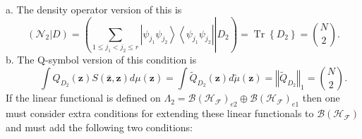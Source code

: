 \documentclass[aps,preprint]{revtex4}%
\begin{document}
\begin{enumerate}
a. The density operator version of this is
\begin{equation}
\left(  \left.  \mathcal{N}_{2}\right\vert D\right)  =\left(  \left.
\sum_{1\leq j_{1}<j_{2}\leq r}\left\vert \psi_{j_{1}}\psi_{j_{2}}\right\rangle
\left\langle \psi_{j_{1}}\psi_{j_{2}}\right\vert \right\vert D_{2}\right)
=\operatorname*{Tr}\left\{  D_{2}\right\}  =\binom{N}{2}.
\end{equation}
b. The Q-symbol version of this condition is
\begin{equation}
\qquad\int Q_{D_{2}}\left(  \mathbf{z}\right)  S\left(  \mathbf{\bar{z}%
,z}\right)  d\mu\left(  \mathbf{z}\right)  =\int\tilde{Q}_{D_{2}}\left(
\mathbf{z}\right)  d\tilde{\mu}\left(  \mathbf{z}\right)  =\left\Vert
\tilde{Q}_{D_{2}}\right\Vert _{1}=\binom{N}{2}.
\end{equation}
If the linear functional is defined on $\Lambda_{2}=\mathcal{B}\left(
\mathcal{H}_{\mathcal{F}}\right)  _{e2}\oplus\mathcal{B}\left(  \mathcal{H}%
_{\mathcal{F}}\right)  _{e1}$ then one must consider extra conditions for
extending these linear functionals to $\mathcal{B}\left(  \mathcal{H}%
_{\mathcal{F}}\right)  $ and must add the following two conditions:


\end{enumerate}
\end{document}
